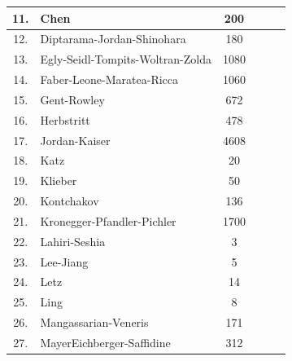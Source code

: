 \documentclass[runningheads]{llncs}
\begin{document}
\begin{table}
\begin{tabular}{c|l|c|c|c|c}
11. & Chen &  200 &  &  &  \\ \hline

12. & Diptarama-Jordan-Shinohara &  180 &  &  &  \\ \hline

13. & Egly-Seidl-Tompits-Woltran-Zolda &  1080 &  &  &  \\ \hline

14. & Faber-Leone-Maratea-Ricca &  1060 &  &  &  \\ \hline

15. & Gent-Rowley &  672 &  &  &  \\ \hline

16. & Herbstritt &  478 & &  &  \\ \hline

17. & Jordan-Kaiser &  4608 & &  &  \\\hline

18. & Katz &  20 &  &  &  \\ \hline

19. & Klieber & 50 &  &  &  \\ \hline

20. & Kontchakov&  136 & &  &  \\ \hline

21. & Kronegger-Pfandler-Pichler &  1700 &  &   & \\ \hline

22. & Lahiri-Seshia & 3 & &  &  \\ \hline

23. & Lee-Jiang &  5 &  &  &  \\ \hline

24. & Letz & 14 &  &  &  \\\hline

25. & Ling &  8 & &  &  \\ \hline

26. & Mangassarian-Veneris &  171 & &  &  \\ \hline

27. & MayerEichberger-Saffidine &  312 & & & \\\hline


\end{tabular}
\end{table}
\end{document}
